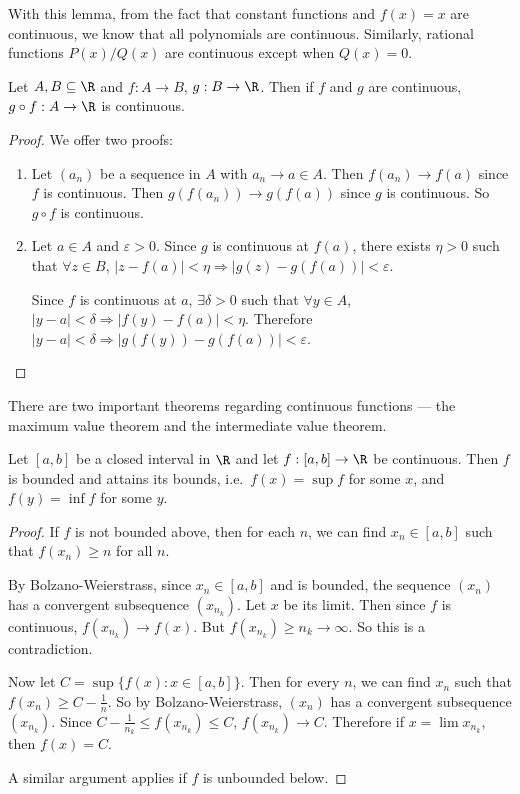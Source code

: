 \documentclass[a4paper]{article}
\begin{document}
With this lemma, from the fact that constant functions and $f(x) = x$ are continuous, we know that all polynomials are continuous. Similarly, rational functions $P(x)/Q(x)$ are continuous except when $Q(x) = 0$.

\begin{lemma}
  Let $A, B\subseteq \R$ and $f: A\to B$, $g: B\to \R$. Then if $f$ and $g$ are continuous, $g\circ f: A\to \R$ is continuous.
\end{lemma}

\begin{proof}
  We offer two proofs:
  \begin{enumerate}
    \item Let $(a_n)$ be a sequence in $A$ with $a_n \to a\in A$. Then $f(a_n) \to f(a)$ since $f$ is continuous. Then $g(f(a_n)) \to g(f(a))$ since $g$ is continuous. So $g\circ f$ is continuous.
    \item Let $a\in A$ and $\varepsilon > 0$. Since $g$ is continuous at $f(a)$, there exists $\eta > 0$ such that $\forall z\in B$, $|z - f(a)| < \eta \Rightarrow |g(z) - g(f(a))| < \varepsilon$.

      Since $f$ is continuous at $a$, $\exists \delta > 0$ such that $\forall y\in A$, $|y - a| < \delta \Rightarrow |f(y) - f(a)| < \eta$. Therefore $|y - a| < \delta \Rightarrow |g(f(y)) - g(f(a))| < \varepsilon$.
  \end{enumerate}
\end{proof}

There are two important theorems regarding continuous functions --- the maximum value theorem and the intermediate value theorem.
\begin{thm}
  Let $[a, b]$ be a closed interval in $\R$ and let $f: [a, b] \to \R$ be continuous. Then $f$ is bounded and attains its bounds, i.e.\ $f(x) = \sup f$ for some $x$, and $f(y) = \inf f$ for some $y$.
\end{thm}

\begin{proof}
  If $f$ is not bounded above, then for each $n$, we can find $x_n\in [a, b]$ such that $f(x_n) \geq n$ for all $n$.

  By Bolzano-Weierstrass, since $x_n \in [a, b]$ and is bounded, the sequence $(x_n)$ has a convergent subsequence $(x_{n_k})$. Let $x$ be its limit. Then since $f$ is continuous, $f(x_{n_k}) \to f(x)$. But $f(x_{n_k}) \geq n_k \to \infty$. So this is a contradiction.

  Now let $C = \sup\{f(x): x\in [a, b]\}$. Then for every $n$, we can find $x_n$ such that $f(x_n) \geq C - \frac{1}{n}$. So by Bolzano-Weierstrass, $(x_n)$ has a convergent subsequence $(x_{n_k})$. Since $C - \frac{1}{n_{k}}\leq f(x_{n_k}) \leq C$, $f(x_{n_k})\to C$. Therefore if $x = \lim x_{n_k}$, then $f(x) = C$.

  A similar argument applies if $f$ is unbounded below.
\end{proof}
\end{document}
